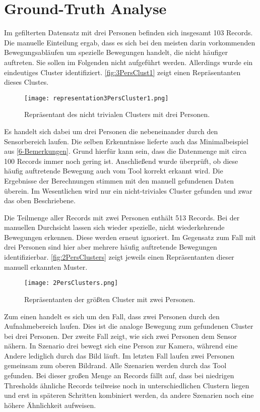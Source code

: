 \section{Ground-Truth Analyse}
\label{6-GroundTruth}
Im gefilterten Datensatz mit drei Personen befinden sich insgesamt 103 Records.
Die manuelle Einteilung ergab,
dass es sich bei den meisten darin vorkommenden Bewegungsabläufen
um spezielle Bewegungen handelt, die nicht häufiger auftreten.
Sie sollen im Folgenden nicht aufgeführt werden.
Allerdings wurde ein eindeutiges Cluster identifiziert.
\autoref{fig:3PersClust1} zeigt einen Repräsentanten dieses Clustes.
\begin{figure}[ht]
    \begin{center}
    \texttt{[image: representation3PersCluster1.png]}
    \end{center}
    \caption{Repräsentant des nicht trivialen Clusters mit drei Personen.}
    \label{fig:3PersClust1}
\end{figure}
Es handelt sich dabei um drei Personen die nebeneinander durch den Sensorbereich laufen.
Die selben Erkenntnisse lieferte auch das Minimalbeispiel aus \autoref{6-Bemerkungen}.
Grund hierfür kann sein, dass die Datenmenge mit circa 100 Records immer noch gering ist.
Anschließend wurde überprüft, ob diese häufig auftretende Bewegung auch
vom Tool korrekt erkannt wird.
Die Ergebnisse der Berechnungen stimmen mit den manuell gefundenen Daten überein.
Im Wesentlichen wird nur ein nicht-triviales Cluster gefunden
und zwar das oben Beschriebene.

Die Teilmenge aller Records mit zwei Personen enthält 513 Records.
Bei der manuellen Durchsicht lassen sich wieder spezielle,
nicht wiederkehrende Bewegungen erkennen.
Diese werden erneut ignoriert.
Im Gegensatz zum Fall mit drei Personen sind hier aber mehrere häufig auftretende Bewegungen identifizierbar.
\autoref{fig:2PersClusters} zeigt jeweils einen Repräsentanten dieser manuell erkannten Muster.
\begin{figure}[ht]
    \begin{center}
    \texttt{[image: 2PersClusters.png]}
    \end{center}
    \caption{Repräsentanten der größten Cluster mit zwei Personen.}
    \label{fig:2PersClusters}
\end{figure}
Zum einen handelt es sich um den Fall, dass zwei Personen durch den Aufnahmebereich laufen.
Dies ist die analoge Bewegung zum gefundenen Cluster bei drei Personen.
Der zweite Fall zeigt, wie sich zwei Personen dem Sensor nähern.
In Szenario drei bewegt sich eine Person zur Kamera,
während eine Andere lediglich durch das Bild läuft.
Im letzten Fall laufen zwei Personen gemeinsam zum oberen Bildrand.
Alle Szenarien werden durch das Tool gefunden.
Bei dieser großen Menge an Records fällt auf,
dass bei niedrigen Thresholds ähnliche Records teilweise noch in unterschiedlichen Clustern liegen
und erst in späteren Schritten kombiniert werden,
da andere Szenarien noch eine höhere Ähnlichkeit aufweisen.

